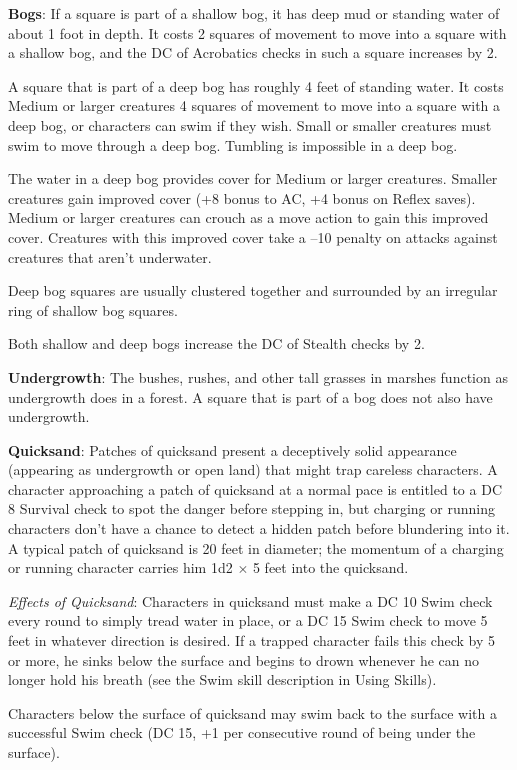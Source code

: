 \textbf{Bogs}: If a square is part of a shallow bog, it has deep mud or standing water of about 1 foot in depth. It costs 2 squares of movement to move into a square with a shallow bog, and the DC of Acrobatics checks in such a square increases by 2. 
				
A square that is part of a deep bog has roughly 4 feet of standing water. It costs Medium or larger creatures 4 squares of movement to move into a square with a deep bog, or characters can swim if they wish. Small or smaller creatures must swim to move through a deep bog. Tumbling is impossible in a deep bog.
				
The water in a deep bog provides cover for Medium or larger creatures. Smaller creatures gain improved cover (+8 bonus to AC, +4 bonus on Reflex saves). Medium or larger creatures can crouch as a move action to gain this improved cover. Creatures with this improved cover take a --10 penalty on attacks against creatures that aren't underwater.
				
Deep bog squares are usually clustered together and surrounded by an irregular ring of shallow bog squares.
				
Both shallow and deep bogs increase the DC of Stealth checks by 2.
				
\textbf{Undergrowth}: The bushes, rushes, and other tall grasses in marshes function as undergrowth does in a forest. A square that is part of a bog does not also have undergrowth. 
				
\textbf{Quicksand}: Patches of quicksand present a deceptively solid appearance (appearing as undergrowth or open land) that might trap careless characters. A character approaching a patch of quicksand at a normal pace is entitled to a DC 8 Survival check to spot the danger before stepping in, but charging or running characters don't have a chance to detect a hidden patch before blundering into it. A typical patch of quicksand is 20 feet in diameter; the momentum of a charging or running character carries him 1d2 \mbox{$\times$} 5 feet into the quicksand.
				
\textit{Effects of Quicksand}: Characters in quicksand must make a DC 10 Swim check every round to simply tread water in place, or a DC 15 Swim check to move 5 feet in whatever direction is desired. If a trapped character fails this check by 5 or more, he sinks below the surface and begins to drown whenever he can no longer hold his breath (see the Swim skill description in Using Skills)\textit{.}
				
Characters below the surface of quicksand may swim back to the surface with a successful Swim check (DC 15, +1 per consecutive round of being under the surface).
				

